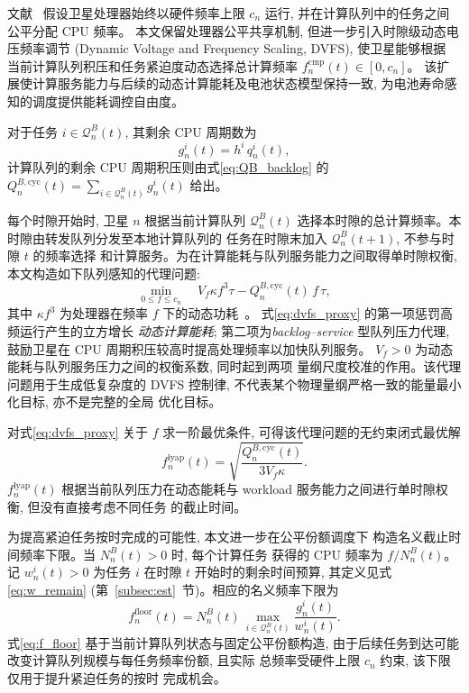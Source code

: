 \documentclass[a4paper,11pt]{article}
\begin{document}
文献~\cite{zhang2024mhspo} 假设卫星处理器始终以硬件频率上限
$c_n$ 运行, 并在计算队列中的任务之间公平分配 CPU 频率。
本文保留处理器公平共享机制, 但进一步引入时隙级动态电压频率调节
(Dynamic Voltage and Frequency Scaling, DVFS), 使卫星能够根据
当前计算队列积压和任务紧迫度动态选择总计算频率
$f^{\mathrm{cmp}}_n(t) \in [0, c_n]$。
该扩展使计算服务能力与后续的动态计算能耗及电池状态模型保持一致,
为电池寿命感知的调度提供能耗调控自由度。

对于任务 $i \in \mathcal{Q}^B_n(t)$, 其剩余 CPU 周期数为
\begin{equation}
    g^i_n(t) = h^i\, q^i_n(t),
    \label{eq:remaining_cycles}
\end{equation}
计算队列的剩余 CPU 周期积压则由式\eqref{eq:QB_backlog} 的
$Q^{B,\mathrm{cyc}}_n(t) = \sum_{i \in \mathcal{Q}^B_n(t)} g^i_n(t)$ 给出。

每个时隙开始时, 卫星 $n$ 根据当前计算队列 $\mathcal{Q}^B_n(t)$
选择本时隙的总计算频率。本时隙由转发队列分发至本地计算队列的
任务在时隙末加入 $\mathcal{Q}^B_n(t+1)$, 不参与时隙 $t$ 的频率选择
和计算服务。为在计算能耗与队列服务能力之间取得单时隙权衡,
本文构造如下队列感知的代理问题:
\begin{equation}
    \min_{0 \le f \le c_n}\quad
    V_f \kappa f^3 \tau - Q^{B,\mathrm{cyc}}_n(t)\, f\, \tau,
    \label{eq:dvfs_proxy}
\end{equation}
其中 $\kappa f^3$ 为处理器在频率 $f$ 下的动态功耗~\cite{zhang2024mhspo}。
式\eqref{eq:dvfs_proxy} 的第一项惩罚高频运行产生的立方增长
\emph{动态计算能耗}; 第二项为\emph{backlog--service} 型队列压力代理,
鼓励卫星在 CPU 周期积压较高时提高处理频率以加快队列服务。
$V_f > 0$ 为动态能耗与队列服务压力之间的权衡系数, 同时起到两项
量纲尺度校准的作用。该代理问题用于生成低复杂度的 DVFS 控制律,
不代表某个物理量纲严格一致的能量最小化目标, 亦不是完整的全局
优化目标。

对式\eqref{eq:dvfs_proxy} 关于 $f$ 求一阶最优条件,
可得该代理问题的无约束闭式最优解
\begin{equation}
    f^{\mathrm{lyap}}_n(t) =
    \sqrt{\frac{Q^{B,\mathrm{cyc}}_n(t)}{3 V_f \kappa}}.
    \label{eq:f_lyap}
\end{equation}
$f^{\mathrm{lyap}}_n(t)$ 根据当前队列压力在动态能耗与
workload 服务能力之间进行单时隙权衡, 但没有直接考虑不同任务
的截止时间。

为提高紧迫任务按时完成的可能性, 本文进一步在公平份额调度下
构造名义截止时间频率下限。当 $N^B_n(t) > 0$ 时, 每个计算任务
获得的 CPU 频率为 $f / N^B_n(t)$。记 $w^i_n(t) > 0$ 为任务 $i$
在时隙 $t$ 开始时的剩余时间预算, 其定义见式\eqref{eq:w_remain}
(第~\ref{subsec:est}~节)。相应的名义频率下限为
\begin{equation}
    f^{\mathrm{floor}}_n(t) =
    N^B_n(t)\, \max_{i \in \mathcal{Q}^B_n(t)} \frac{g^i_n(t)}{w^i_n(t)}.
    \label{eq:f_floor}
\end{equation}
式\eqref{eq:f_floor} 基于当前计算队列状态与固定公平份额构造,
由于后续任务到达可能改变计算队列规模与每任务频率份额, 且实际
总频率受硬件上限 $c_n$ 约束, 该下限仅用于提升紧迫任务的按时
完成机会。
\end{document}

